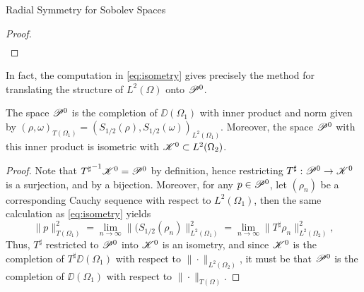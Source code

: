 \begin{chapter}{Radial Symmetry for Sobolev Spaces}
\begin{proof}
\begin{align}
\end{align}
\end{proof}
In fact, the computation in \eqref{eq:isometry} gives precisely the method for translating the structure of $L^2(\Omega)$ onto $\mathscr P^0$.
\begin{thm}
  The space $\mathscr P^0$ is the completion of $\DD(\Omega_1)$ with inner product and norm given by $(\rho,\omega)_{T(\Omega_1)} = \left( S_{1/2}(\rho),S_{1/2}(\omega) \right)_{L^2(\Omega_1)}$.
  Moreover, the space $\mathscr P^0$ with this inner product is isometric with $\mathscr K^0 \subset L^2(\Omega_2)$.
\end{thm}
\begin{proof}
  Note that ${T^\sharp}^{-1}\mathscr K^0 = \mathscr P^0$ by definition, hence restricting $T^\sharp: \mathscr P^0 \to \mathscr K^0$ is a surjection, and by  a bijection.
  Moreover, for any $p \in \mathscr P^0$, let $(\rho_n)$ be a corresponding Cauchy sequence with respect to $L^2(\Omega_1)$, then the same calculation as \eqref{eq:isometry} yields 
  \begin{equation}
    \|p\|_{T(\Omega_1)}^2 = \lim_{n\to\infty} \|(S_{1/2}(\rho_n)\|^2_{L^2(\Omega_1)} = \lim_{n\to\infty} \|T^\sharp \rho_n \|^2_{L^2(\Omega_2)},
  \end{equation}
  Thus, $T^\sharp$ restricted to $\mathscr P^0$ into $\mathscr K^0$ is an isometry, and since $\mathscr K^0$ is the completion of $T^\sharp \DD(\Omega_1)$ with respect to $\| \cdot \|_{L^2(\Omega_2)}$, it must be that $\mathscr P^0$ is the completion of $\DD(\Omega_1)$ with respect to $\|\cdot \|_{T(\Omega)}$.
\end{proof}


\end{chapter}
